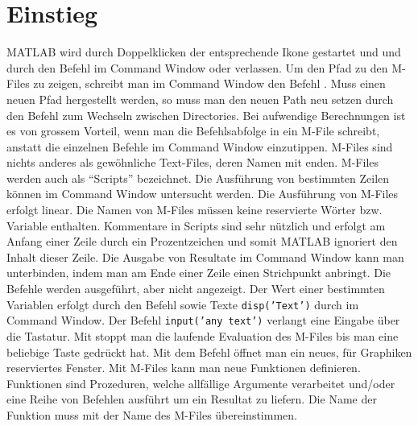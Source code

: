 \section{Einstieg}
MATLAB wird durch Doppelklicken der entsprechende Ikone gestartet und und durch den Befehl im Command Window  oder  verlassen.
\newline\newline
Um den Pfad zu den M-Files zu zeigen, schreibt man im Command Window den Befehl . Muss einen neuen Pfad hergestellt werden, so muss man den neuen Path neu setzen durch den Befehl  zum Wechseln zwischen Directories. Bei aufwendige Berechnungen ist es von grossem Vorteil, wenn man die Befehlsabfolge in ein M-File schreibt, anstatt die einzelnen Befehle im Command Window einzutippen.
\newline\newline
M-Files sind nichts anderes als gewöhnliche Text-Files, deren Namen mit  enden. M-Files werden auch als ``Scripts'' bezeichnet. Die Ausführung von bestimmten Zeilen können im Command Window untersucht werden. Die Ausführung von M-Files erfolgt linear. Die Namen von M-Files müssen keine reservierte Wörter bzw. Variable enthalten.
\newline\newline
Kommentare in Scripts sind sehr nützlich und erfolgt am Anfang einer Zeile durch ein Prozentzeichen \boxed{\textbf{\texttt{\%}}} und somit MATLAB ignoriert den Inhalt dieser Zeile. Die Ausgabe von Resultate im Command Window kann man unterbinden, indem man am Ende einer Zeile einen Strichpunkt \boxed{\textbf{\texttt{;}}} anbringt. Die Befehle werden ausgeführt, aber nicht angezeigt. Der Wert einer bestimmten Variablen erfolgt durch den Befehl  sowie Texte {\color{red}\texttt{disp('Text')}} durch im Command Window. Der Befehl {\color{red}\texttt{input('any text')}} verlangt eine Eingabe über die Tastatur. Mit  stoppt man die laufende Evaluation des M-Files bis man eine beliebige Taste gedrückt hat. Mit dem Befehl  öffnet man ein neues, für Graphiken reserviertes Fenster.
\newline\newline
Mit M-Files kann man neue Funktionen definieren. Funktionen sind Prozeduren, welche allfällige Argumente verarbeitet und/oder eine Reihe von Befehlen ausführt um ein Resultat zu liefern. Die Name der Funktion muss mit der Name des M-Files übereinstimmen.
